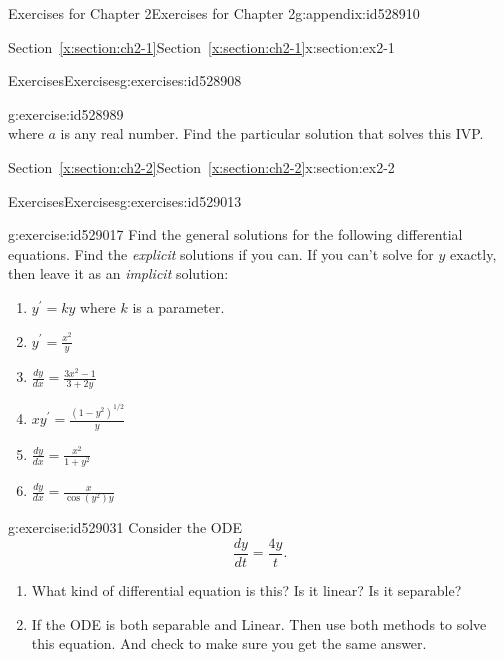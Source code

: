 \documentclass[oneside,10pt,]{book}
\newcommand{\xreffont}{\relax}
\numberwithin{equation}{section}
\numberwithin{equation}{section}
\begin{document}
\begin{appendixptx}{Exercises for Chapter 2}{}{Exercises for Chapter 2}{}{}{g:appendix:id528910}
\begin{sectionptx}{Section~{\xreffont\ref*{x:section:ch2-1}}}{}{Section~{\xreffont\ref*{x:section:ch2-1}}}{}{}{x:section:ex2-1}
\begin{exercises-subsection-numberless}{Exercises}{}{Exercises}{}{}{g:exercises:id528908}
\begin{divisionexercise}{3}{}{}{g:exercise:id528989}
\begin{equation*}
\end{equation*}
where \(a\) is any real number. Find the particular solution that solves this IVP.%
\end{divisionexercise}%
\end{exercises-subsection-numberless}
\end{sectionptx}
%
%
\typeout{************************************************}
\typeout{Section C.2 Section~{\xreffont\ref*{x:section:ch2-2}}}
\typeout{************************************************}
%
\begin{sectionptx}{Section~{\xreffont\ref*{x:section:ch2-2}}}{}{Section~{\xreffont\ref*{x:section:ch2-2}}}{}{}{x:section:ex2-2}
%
%
\typeout{************************************************}
\typeout{************************************************}
%
\begin{exercises-subsection-numberless}{Exercises}{}{Exercises}{}{}{g:exercises:id529013}
\begin{divisionexercise}{1}{}{}{g:exercise:id529017}%
Find the general solutions for the following differential equations. Find the \emph{explicit} solutions if you can. If you can't solve for \(y\) exactly, then leave it as an \emph{implicit} solution:%
\begin{enumerate}[label=(\alph*)]
\item{}\(y^{\prime}=ky\) where \(k\) is a parameter.%
\item{}\(\displaystyle y^{\prime}=\frac{x^{2}}{y}\)%
\item{}\(\displaystyle \frac{dy}{dx}=\frac{3x^{2}-1}{3+2y}\)%
\item{}\(\displaystyle xy^{\prime}=\frac{\left(1-y^{2}\right)^{1/2}}{y}\)%
\item{}\(\displaystyle \frac{dy}{dx}=\frac{x^{2}}{1+y^{2}}\)%
\item{}\(\displaystyle \frac{dy}{dx}=\frac{x}{\cos\left(y^{2}\right)y}\)%
\end{enumerate}
%
\end{divisionexercise}%
\begin{divisionexercise}{2}{}{}{g:exercise:id529031}%
Consider the ODE%
\begin{equation*}
\frac{dy}{dt}=\frac{4y}{t}.
\end{equation*}
%
%
\begin{enumerate}[label=(\alph*)]
\item{}What kind of differential equation is this? Is it linear? Is it separable?%
\item{}If the ODE is both separable and Linear. Then use both methods to solve this equation. And check to make sure you get the same answer.%

\end{enumerate}
\end{divisionexercise}
\end{exercises-subsection-numberless}
\end{sectionptx}
\end{appendixptx}
\end{document}
